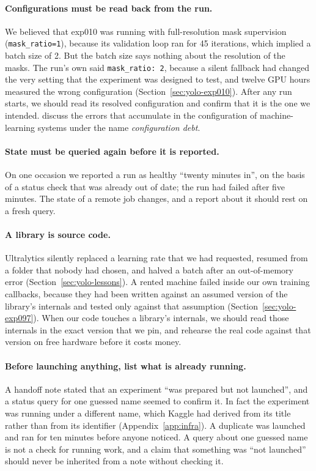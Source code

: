 \paragraph{Configurations must be read back from the run.} We believed that exp010 was running with
full-resolution mask supervision (\texttt{mask\_ratio=1}), because its validation loop ran for 45
iterations, which implied a batch size of 2. But the batch size says nothing about the resolution of
the masks. The run's own  said \texttt{mask\_ratio: 2}, because a silent fallback had
changed the very setting that the experiment was designed to test, and twelve GPU hours measured the
wrong configuration (Section~\ref{sec:yolo-exp010}). After any run starts, we should read its resolved
configuration and confirm that it is the one we intended. \citet{sculley2015} discuss the errors
that accumulate in the configuration of machine-learning systems under the name
\emph{configuration debt}.

\paragraph{State must be queried again before it is reported.} On one occasion we reported a run as
healthy ``twenty minutes in'', on the basis of a status check that was already out of date; the run had
failed after five minutes. The state of a remote job changes, and a report about it should rest on a
fresh query.

\paragraph{A library is source code.} Ultralytics silently replaced a learning rate that we had
requested, resumed from a folder that nobody had chosen, and halved a batch after an out-of-memory error
(Section~\ref{sec:yolo-lessons}). A rented machine failed inside our own training callbacks, because
they had been written against an assumed version of the library's internals and tested only against
that assumption (Section~\ref{sec:yolo-exp097}). When our code touches a library's internals, we should
read those internals in the exact version that we pin, and rehearse the real code against that version
on free hardware before it costs money.

\paragraph{Before launching anything, list what is already running.} A handoff note stated that an
experiment ``was prepared but not launched'', and a status query for one guessed name seemed to confirm
it. In fact the experiment was running under a different name, which Kaggle had derived from its
title rather than from its identifier (Appendix~\ref{app:infra}). A duplicate was launched and ran for
ten minutes before anyone noticed. A query about one guessed name is not a check for running work, and
a claim that something was ``not launched'' should never be inherited from a note without checking it.

